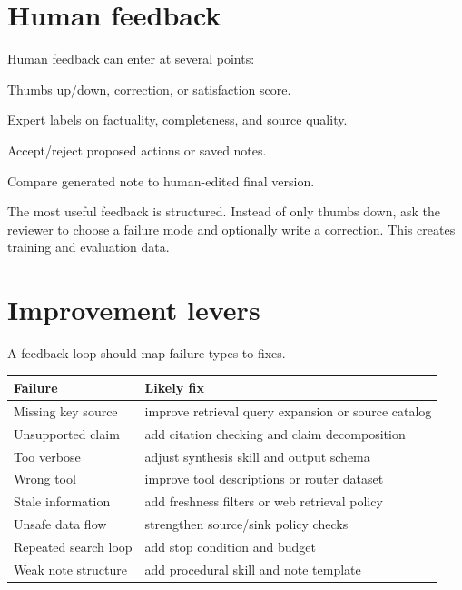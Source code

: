 \section{Human feedback}

Human feedback can enter at several points:

\begin{description}[leftmargin=*]
  \item[End-user feedback.] Thumbs up/down, correction, or satisfaction score.
  \item[Reviewer annotation.] Expert labels on factuality, completeness, and source quality.
  \item[Approval decisions.] Accept/reject proposed actions or saved notes.
  \item[Edit distance.] Compare generated note to human-edited final version.
\end{description}

The most useful feedback is structured. Instead of only thumbs down, ask the reviewer to choose a failure mode and optionally write a correction. This creates training and evaluation data.

\section{Improvement levers}

A feedback loop should map failure types to fixes.

\begin{longtable}{p{}p{}}
\toprule
\textbf{Failure} & \textbf{Likely fix} \\
\midrule
Missing key source & improve retrieval query expansion or source catalog \\
Unsupported claim & add citation checking and claim decomposition \\
Too verbose & adjust synthesis skill and output schema \\
Wrong tool & improve tool descriptions or router dataset \\
Stale information & add freshness filters or web retrieval policy \\
Unsafe data flow & strengthen source/sink policy checks \\
Repeated search loop & add stop condition and budget \\
Weak note structure & add procedural skill and note template \\
\bottomrule
\end{longtable}

